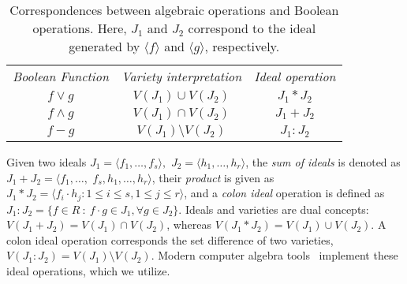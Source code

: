 \def\arraystretch{2}
\begin{table}[hbt!]
  \centering
  {\scriptsize
  \caption{Correspondences between algebraic operations and Boolean operations. 
  Here, $J_1$ and $J_2$ correspond to the ideal generated by $\langle f \rangle$ and $\langle g \rangle$, respectively.
  }\label{tab:var_ideal_corr}
  \begin{tabular} 
    {!{\vrule width 1pt} c !{\vrule width 1pt} c !{\vrule width 1pt} c !{\vrule width 1pt}}  
    {\it {Boolean Function}} & {\it{Variety interpretation}} & {\it{Ideal operation}} \\                                   
    $f \lor g$              & $V(J_1) \cup V(J_2)$            & $J_1 * J_2$           \\ \hline
    $f \land g$              & $V(J_1) \cap V(J_2)$            & $J_1 + J_2$               \\ \hline
    $f - g$                 & $V(J_1) \setminus V(J_2)$       & $J_1 : J_2$               \\ \hline
  \end{tabular}}
\end{table}

Given two ideals $J_1 = \langle
f_1,\dots,f_s\rangle,$ $J_2=\langle h_1,\dots,h_r\rangle$, the {\it 
  sum of ideals} is denoted as $J_1 + J_2 = \langle
f_1,\dots,$ $f_s,h_1,\dots,h_r\rangle$, their {\it  product} is
given as $J_1 * J_2 = \langle f_i\cdot h_j: 1\leq i\leq s, 1\leq
j\leq r\rangle$, and a {\it  colon ideal} operation is defined as
$J_1:J_2 = \{f \in R\ :\ f\cdot g \in J_1, \forall g \in J_2\}$. 
Ideals and varieties are dual concepts:
$V(J_1 + J_2) = V(J_1) \cap V(J_2)$, whereas $V(J_1 * J_2) = V(J_1)
\cup V(J_2)$. A colon ideal operation corresponds the set difference of 
two varieties, $V(J_1:J_2)=V(J_1)
\setminus V(J_2)$. 
Modern computer algebra tools~\cite{DGPS_410,pbori:JSC09} implement these ideal operations, which we utilize.\\


